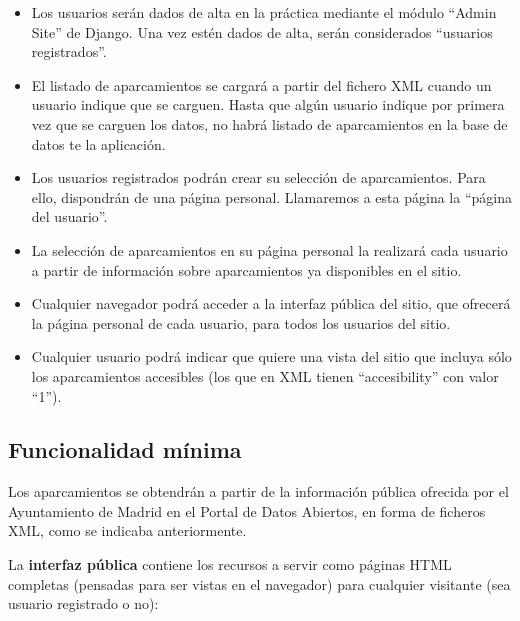 \begin{itemize}
  \item Los usuarios serán dados de alta en la práctica mediante el módulo ``Admin Site'' de Django. Una vez estén dados de alta, serán considerados ``usuarios registrados''.

  \item El listado de aparcamientos se cargará a partir del fichero XML cuando un usuario indique que se carguen. Hasta que algún usuario indique por primera vez que se carguen los datos, no habrá listado de aparcamientos en la base de datos te la aplicación.

  \item Los usuarios registrados podrán crear su selección de aparcamientos. Para ello, dispondrán de una página personal. Llamaremos a esta página la ``página del usuario''.

  \item La selección de aparcamientos en su página personal la realizará cada usuario a partir de información sobre aparcamientos ya disponibles en el sitio.

  \item Cualquier navegador podrá acceder a la interfaz pública del sitio, que ofrecerá la página personal de cada usuario, para todos los usuarios del sitio.

  \item Cualquier usuario podrá indicar que quiere una vista del sitio que incluya sólo los aparcamientos accesibles (los que en XML tienen ``accesibility'' con valor ``1'').
\end{itemize}


\subsection{Funcionalidad mínima}

Los aparcamientos se obtendrán a partir de la información pública ofrecida por el Ayuntamiento de Madrid en el Portal de Datos Abiertos, en forma de ficheros XML, como se indicaba anteriormente.

La {\bf interfaz pública} contiene los recursos a servir como páginas HTML completas (pensadas para ser vistas en el navegador) para cualquier visitante (sea usuario registrado o no):

